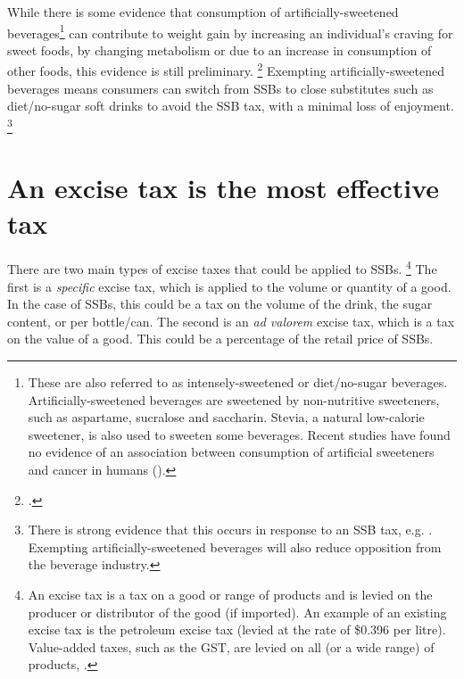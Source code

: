 \documentclass[embargoed]{grattan}
\begin{document}
While there is some evidence that consumption of artificially-sweetened beverages\footnote{These are also referred to as intensely-sweetened or diet/no-sugar beverages.
Artificially-sweetened beverages are sweetened by non-nutritive sweeteners, such as aspartame, sucralose and saccharin.
Stevia, a natural low-calorie sweetener, is also used to sweeten some beverages.
Recent studies have found no evidence of an association between consumption of artificial sweeteners and cancer in humans (\textcites{Institute2009ArtificialSweetenersCancer}{CancerCouncil2015Artificialsweetenersdo}).} can contribute to weight gain by increasing an individual's craving for sweet foods, by changing metabolism or due to an increase in consumption of other foods, this evidence is still preliminary.%
\footcites{Mattes2009Nonnutritivesweetenerconsumption}{Popkin2012Sugarybeveragesrepresent}{Yang2010Gainweightgoing}{Swithers2013Artificialsweetenersproduce}{Green2012Alteredprocessingsweet}{Fowler2008Fuelingobesityepidemic}{Friedman2012Sugarsweetenedbeverage} Exempting artificially-sweetened beverages means consumers can switch from SSBs to close substitutes such as diet/no-sugar soft drinks to avoid the SSB tax, with a minimal loss of enjoyment.%
\footnote{There is strong evidence that this occurs in response to an SSB tax, e.g. \textcites{Briggs2013Overallincomespecific}{Sharma2014effectstaxingsugarsweetened}{Zhen2010Habitformationdemand}.
Exempting artificially-sweetened beverages will also reduce opposition from the beverage industry.}

\section{An excise tax is the most effective tax}\label{an-excise-tax-is-the-most-effective-tax}

There are two main types of excise taxes that could be applied to SSBs.%
\footnote{An excise tax is a tax on a good or range of products and is levied on the producer or distributor of the good (if imported).
An example of an existing excise tax is the petroleum excise tax (levied at the rate of \$0.396 per litre).
Value-added taxes, such as the GST, are levied on all (or a wide range) of products, \textcite{CnossenExcisetaxationAustralia}.} The first is a \emph{specific} excise tax, which is applied to the volume or quantity of a good.
In the case of SSBs, this could be a tax on the volume of the drink, the sugar content, or per bottle/can.
The second is an \emph{ad valorem} excise tax, which is a tax on the value of a good.
This could be a percentage of the retail price of SSBs.
\end{document}
